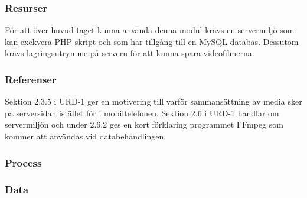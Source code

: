 \subsubsection{Resurser}
För att över huvud taget kunna använda denna modul krävs en servermiljö som kan exekvera PHP-skript och som har tillgång till en MySQL-databas. Dessutom krävs lagringsutrymme på servern för att kunna spara videofilmerna.

\subsubsection{Referenser}
Sektion 2.3.5 i URD-1 ger en motivering till varför sammansättning av media sker på serversidan istället för i mobiltelefonen. Sektion 2.6 i URD-1 handlar om servermiljön och under 2.6.2 ges en kort förklaring programmet FFmpeg som kommer att användas vid databehandlingen.

\subsubsection{Process}

\subsubsection{Data}
